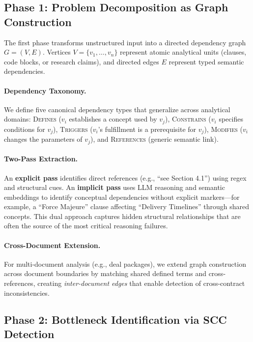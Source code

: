 \documentclass{article}
\begin{document}
\subsection{Phase 1: Problem Decomposition as Graph Construction}

The first phase transforms unstructured input into a directed dependency graph $G = (V, E)$. Vertices $V = \{v_1, \dots, v_n\}$ represent atomic analytical units (clauses, code blocks, or research claims), and directed edges $E$ represent typed semantic dependencies.

\paragraph{Dependency Taxonomy.} We define five canonical dependency types that generalize across analytical domains:
\textsc{Defines} ($v_i$ establishes a concept used by $v_j$),
\textsc{Constrains} ($v_i$ specifies conditions for $v_j$),
\textsc{Triggers} ($v_i$'s fulfillment is a prerequisite for $v_j$),
\textsc{Modifies} ($v_i$ changes the parameters of $v_j$), and
\textsc{References} (generic semantic link).

\paragraph{Two-Pass Extraction.} An \textbf{explicit pass} identifies direct references (e.g., ``see Section 4.1'') using regex and structural cues. An \textbf{implicit pass} uses LLM reasoning and semantic embeddings to identify conceptual dependencies without explicit markers---for example, a ``Force Majeure'' clause affecting ``Delivery Timelines'' through shared concepts. This dual approach captures hidden structural relationships that are often the source of the most critical reasoning failures.

\paragraph{Cross-Document Extension.} For multi-document analysis (e.g., deal packages), we extend graph construction across document boundaries by matching shared defined terms and cross-references, creating \emph{inter-document edges} that enable detection of cross-contract inconsistencies.

\subsection{Phase 2: Bottleneck Identification via SCC Detection}
\end{document}
